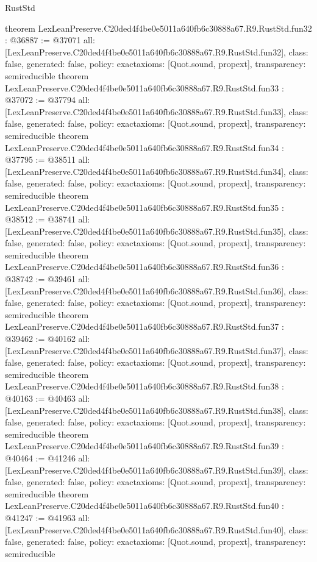 \begin{lexlean}{RustStd}
\begin{coremodule}
{}
theorem LexLeanPreserve.C20ded4f4be0e5011a640fb6c30888a67.R9.RustStd.fun32 : @36887 := @37071 {
  all: [LexLeanPreserve.C20ded4f4be0e5011a640fb6c30888a67.R9.RustStd.fun32],
  class: false,
  generated: false,
  policy: exact{axioms: [Quot.sound, propext]},
  transparency: semireducible
}
theorem LexLeanPreserve.C20ded4f4be0e5011a640fb6c30888a67.R9.RustStd.fun33 : @37072 := @37794 {
  all: [LexLeanPreserve.C20ded4f4be0e5011a640fb6c30888a67.R9.RustStd.fun33],
  class: false,
  generated: false,
  policy: exact{axioms: [Quot.sound, propext]},
  transparency: semireducible
}
theorem LexLeanPreserve.C20ded4f4be0e5011a640fb6c30888a67.R9.RustStd.fun34 : @37795 := @38511 {
  all: [LexLeanPreserve.C20ded4f4be0e5011a640fb6c30888a67.R9.RustStd.fun34],
  class: false,
  generated: false,
  policy: exact{axioms: [Quot.sound, propext]},
  transparency: semireducible
}
theorem LexLeanPreserve.C20ded4f4be0e5011a640fb6c30888a67.R9.RustStd.fun35 : @38512 := @38741 {
  all: [LexLeanPreserve.C20ded4f4be0e5011a640fb6c30888a67.R9.RustStd.fun35],
  class: false,
  generated: false,
  policy: exact{axioms: [Quot.sound, propext]},
  transparency: semireducible
}
theorem LexLeanPreserve.C20ded4f4be0e5011a640fb6c30888a67.R9.RustStd.fun36 : @38742 := @39461 {
  all: [LexLeanPreserve.C20ded4f4be0e5011a640fb6c30888a67.R9.RustStd.fun36],
  class: false,
  generated: false,
  policy: exact{axioms: [Quot.sound, propext]},
  transparency: semireducible
}
theorem LexLeanPreserve.C20ded4f4be0e5011a640fb6c30888a67.R9.RustStd.fun37 : @39462 := @40162 {
  all: [LexLeanPreserve.C20ded4f4be0e5011a640fb6c30888a67.R9.RustStd.fun37],
  class: false,
  generated: false,
  policy: exact{axioms: [Quot.sound, propext]},
  transparency: semireducible
}
theorem LexLeanPreserve.C20ded4f4be0e5011a640fb6c30888a67.R9.RustStd.fun38 : @40163 := @40463 {
  all: [LexLeanPreserve.C20ded4f4be0e5011a640fb6c30888a67.R9.RustStd.fun38],
  class: false,
  generated: false,
  policy: exact{axioms: [Quot.sound, propext]},
  transparency: semireducible
}
theorem LexLeanPreserve.C20ded4f4be0e5011a640fb6c30888a67.R9.RustStd.fun39 : @40464 := @41246 {
  all: [LexLeanPreserve.C20ded4f4be0e5011a640fb6c30888a67.R9.RustStd.fun39],
  class: false,
  generated: false,
  policy: exact{axioms: [Quot.sound, propext]},
  transparency: semireducible
}
theorem LexLeanPreserve.C20ded4f4be0e5011a640fb6c30888a67.R9.RustStd.fun40 : @41247 := @41963 {
  all: [LexLeanPreserve.C20ded4f4be0e5011a640fb6c30888a67.R9.RustStd.fun40],
  class: false,
  generated: false,
  policy: exact{axioms: [Quot.sound, propext]},
  transparency: semireducible
}
\end{coremodule}
\end{lexlean}

